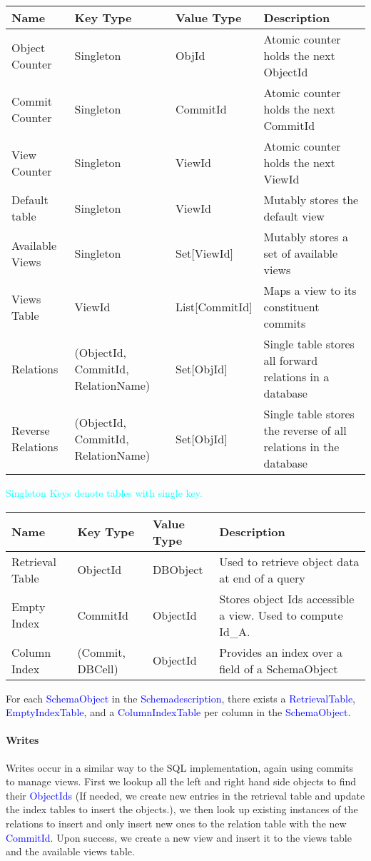 \documentclass[12pt,a4paper,twoside,openright]{report}
\newcommand\codeName[1]{\textcolor{blue}{#1}}
\newcommand\note[1]{\textcolor{cyan}{#1}}
\begin{document}
{{\begin{center}
\begin{tabular}{ |p{3cm}||p{3cm}|p{3cm}||p{3cm}|}
	Name & Key Type & Value Type  & Description \\ \hline
	Object Counter & Singleton & ObjId & Atomic counter holds the next ObjectId \\ \hline
	Commit Counter & Singleton & CommitId & Atomic counter holds the next CommitId \\ \hline
	View Counter & Singleton & ViewId & Atomic counter holds the next ViewId \\ \hline
	Default table & Singleton & ViewId & Mutably stores the default view \\ \hline
	Available Views & Singleton & Set[ViewId] & Mutably stores a set of available views \\ \hline
	Views Table & ViewId & List[CommitId] & Maps a view to its constituent commits \\ \hline
	Relations & (ObjectId, CommitId, RelationName) & Set[ObjId] & Single table stores all forward relations in a database \\ \hline
	Reverse Relations & (ObjectId, CommitId, RelationName) & Set[ObjId] & Single table stores the reverse of all relations in the database \\ \hline
	\end{tabular}
\end{center} 
 
 \note{Singleton Keys denote tables with single key.}
 \begin{center}
	\begin{tabular}{ |p{3cm}||p{3cm}|p{3cm}||p{3cm}|}
 	\hline
	Name & Key Type & Value Type  & Description \\ \hline
	Retrieval Table & ObjectId & DBObject & Used to retrieve object data at end of a query \\ \hline
	Empty Index & CommitId & ObjectId & Stores object Ids accessible a view. Used to compute Id_A. \\ \hline
	Column Index &  (Commit, DBCell) & ObjectId & Provides an index over a field of a SchemaObject \\ \hline
	\end{tabular}
\end{center}

For each \codeName{SchemaObject} in the \codeName{Schemadescription}, there exists a \codeName{RetrievalTable}, \codeName{EmptyIndexTable}, and a \codeName{ColumnIndexTable} per column in the \codeName{SchemaObject}.
		
		
		\paragraph{Writes}
		Writes occur in a similar way to the SQL implementation, again using commits to manage views. First we lookup all the left and right hand side objects to find their \codeName{ObjectIds} (If needed, we create new entries in the retrieval table and update the index tables to insert the objects.), we then look up existing instances of the relations to insert and only insert new ones to the relation table with the new \codeName{CommitId}. Upon success, we create a new view and insert it to the views table and the available views table.

}}
\end{document}
